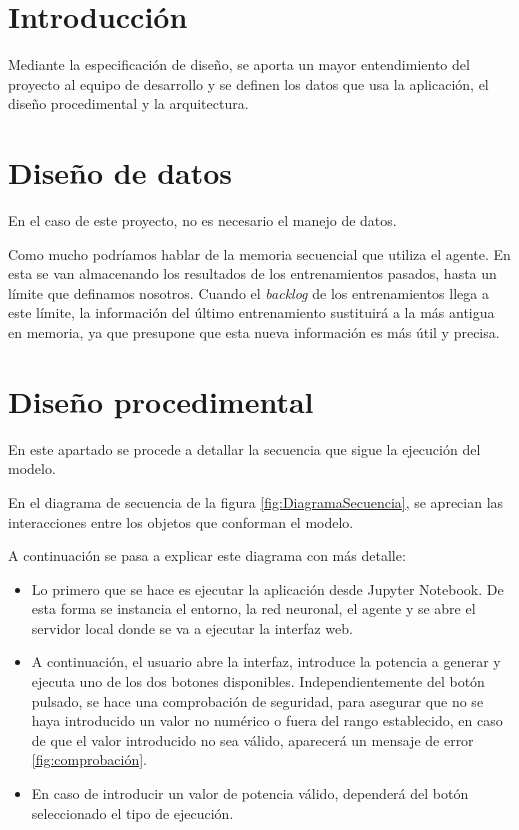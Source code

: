 
\section{Introducción}

Mediante la especificación de diseño, se aporta un mayor entendimiento del proyecto al equipo de desarrollo y se definen los datos que usa la aplicación, el diseño procedimental y la arquitectura.

\section{Diseño de datos}

En el caso de este proyecto, no es necesario el manejo de datos.

Como mucho podríamos hablar de la memoria secuencial que utiliza el agente. En esta se van almacenando los resultados de los entrenamientos pasados, hasta un límite que definamos nosotros.
Cuando el \textit{backlog} de los entrenamientos llega a este límite, la información del último entrenamiento sustituirá a la más antigua en memoria, ya que presupone que esta nueva información es más útil y precisa.

\section{Diseño procedimental}

En este apartado se procede a detallar la secuencia que sigue la ejecución del modelo. 

En el diagrama de secuencia\cite{diagramaSecuencia} de la figura \ref{fig:DiagramaSecuencia}, se aprecian las interacciones entre los objetos que conforman el modelo.

\label{fig:DiagramaSecuencia}

A continuación se pasa a explicar este diagrama con más detalle:

\begin{itemize}
    \item Lo primero que se hace es ejecutar la aplicación desde Jupyter Notebook. De esta forma se instancia el entorno, la red neuronal, el agente y se abre el servidor local donde se va a ejecutar la interfaz web.
    \item A continuación, el usuario abre la interfaz, introduce la potencia a generar y ejecuta uno de los dos botones disponibles. Independientemente del botón pulsado, se hace una comprobación de seguridad, para asegurar que no se haya introducido un valor no numérico o fuera del rango establecido, en caso de que el valor introducido no sea válido, aparecerá un mensaje de error \ref{fig:comprobación}.
    \item En caso de introducir un valor de potencia válido, dependerá del botón seleccionado el tipo de ejecución.
\end{itemize}

